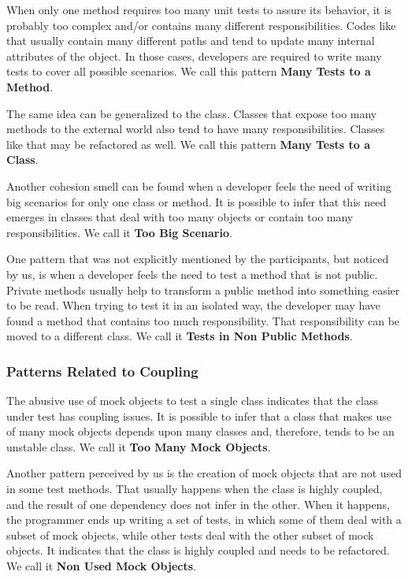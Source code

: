 \documentclass[times]{speauth}
\begin{document}
When only one method requires too many unit tests to assure its behavior,
it is probably too complex and/or contains many different responsibilities.
Codes like that usually contain many different paths and tend to update
many internal attributes of the object. In those cases, developers
are required to write many tests to cover all possible scenarios.
We call this pattern \textbf{Many Tests to a Method}.

The same idea can be generalized to the class. Classes that expose too 
many methods to the external world also tend to have many responsibilities.
Classes like that may be refactored as well.
We call this pattern \textbf{Many Tests to a Class}.

Another cohesion smell can be found when a developer feels the need
of writing big scenarios for only one class or method. It is possible to infer
that this need emerges in classes that deal with too many objects or
contain too many responsibilities. We call it \textbf{Too Big Scenario}.

One pattern that was not explicitly mentioned by the participants, but
noticed by us, is when a developer feels the need to test a method
that is not public. Private methods usually help to transform a public method
into something easier to be read. When trying to test it in an isolated
way, the developer may have found a method that contains too much responsibility.
That responsibility can be moved to a different class. We call it \textbf{Tests in Non Public Methods}.

\subsubsection{Patterns Related to Coupling}

The abusive use of mock objects to test a single class indicates that
the class under test has coupling issues. It is possible to infer that a class
that makes use of many mock objects depends upon many classes and, therefore,
tends to be an unstable class. We call it \textbf{Too Many Mock Objects}.

Another pattern perceived by us is the creation of mock objects that are
not used in some test methods. That usually happens when the class
is highly coupled, and the result of one dependency does not infer in
the other. When it happens, the programmer ends up writing a set of tests,
in which some of them deal with a subset of mock objects, while other
tests deal with the other subset of mock objects. It indicates that
the class is highly coupled and needs to be refactored. We call it
\textbf{Non Used Mock Objects}.
\end{document}
